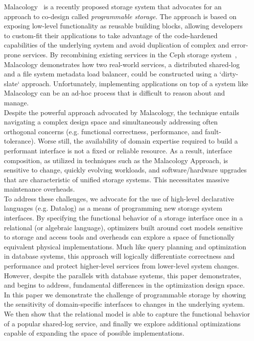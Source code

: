 Malacology~\cite{sevilla:eurosys17} is a recently proposed storage system that
advocates for an approach to co-design called \emph{programmable storage}. The
approach is based on exposing low-level functionality as reusable building
blocks, allowing developers to custom-fit their applications to take advantage
of the code-hardened capabilities of the underlying system and avoid
duplication of complex and error-prone services. By recombining existing
services in the Ceph storage system~\cite{weil:osdi2006-ceph}, Malacology demonstrates how two
real-world services, a distributed shared-log and a file system metadata load
balancer, could be constructed using a `dirty-slate` approach. Unfortunately, implementing
applications on top of a system like Malacology can be an ad-hoc process
that is difficult to reason about and manage.
\\ \indent
Despite the powerful approach advocated by Malacology, the technique entails navigating 
a complex design space and simultaneously addressing often orthogonal
concerns (e.g. functional correctness, performance, and fault-tolerance).
Worse still, the availability of domain expertise required to build a performant interface is not a fixed or reliable resource. 
As a result, interface composition, as utilized in techniques such as the Malacology Approach, is sensitive to
change, quickly evolving workloads, and software/hardware upgrades that are characteristic of unified storage systems.
This necessitates massive maintenance overheads.
\\ \indent
To address these challenges, we advocate for the use of high-level declarative
languages (e.g. Datalog) as a means of programming new storage system
interfaces.  By specifying the functional behavior of a storage interface once
in a relational (or algebraic language), optimizers built around cost models
sensitive to storage and access tools and overheads can explore a space of
functionally equivalent physical implementations. Much like query planning and
optimization in database systems, this approach will logically differentiate
correctness and performance and protect higher-level services from lower-level
system changes. However, despite the parallels with database systems, this
paper demonstrates, and begins to address, fundamental differences in the
optimization design space.
\\ \indent
In this paper we demonstrate the challenge of programmable storage by showing
the sensitivity of domain-specific interfaces to changes in the underlying
system. We then show that the relational model is able to capture the
functional behavior of a popular shared-log service, and finally we explore
additional optimizations capable of expanding the space of
possible implementations.
